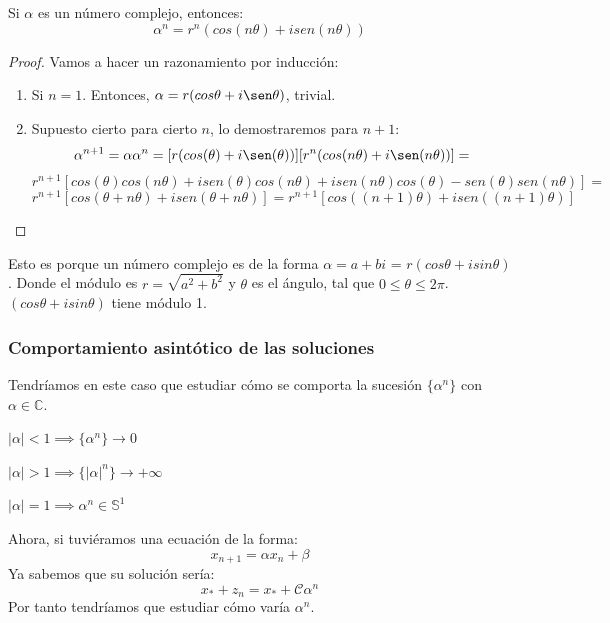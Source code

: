 \begin{nprop}
	Si $\alpha$ es un número complejo, entonces:
	\[
	\alpha^n = r^n(cos(n\theta) + i sen(n\theta))
	\]
	\begin{proof}
	Vamos a hacer un razonamiento por inducción:
	\begin{enumerate}
	\item Si $n=1$. Entonces, $\alpha = r(cos\theta +i\sen\theta)$, trivial.
	\item Supuesto cierto para cierto $n$, lo demostraremos para $n+1$:
	\[
	\alpha^{n+1} = \alpha\alpha^n =  [r(cos(\theta) +i\sen(\theta))] [r^n(cos(n\theta) +i\sen(n\theta))]=
	\]
	\[
	r^{n+1}[cos(\theta) cos(n\theta) +i sen(\theta) cos(n\theta) + isen(n\theta) cos(\theta) - sen(\theta) sen(n\theta)] = \]
	\[r^{n+1}[cos(\theta+n\theta)+isen(\theta+n\theta)] = r^{n+1}[cos((n+1)\theta)+isen((n+1)\theta)]
	\]
\end{enumerate}

\end{proof}
\end{nprop}

\begin{nota}
	Esto es porque un número complejo es de la forma $\alpha = a+bi$ = $r(cos\theta + i sin\theta)$.
	Donde el módulo es $r=\sqrt{a^2 + b^2}$ y $\theta$ es el ángulo, tal que $0 \leq \theta \leq 2\pi$.
	$(cos\theta + i sin\theta)$ tiene módulo 1.

\end{nota}

\subsubsection{Comportamiento asintótico de las soluciones}
Tendríamos en este caso que estudiar cómo se comporta la sucesión $\{\alpha^n\}$ con $\alpha \in \mathbb{C}$.
\begin{nprop}\hfill
\begin{nlist}
	\item $|\alpha|< 1 \implies \{\alpha^n\}\to 0$
	\item $|\alpha|> 1 \implies \{|\alpha|^n\}\to +\infty$
	\item $|\alpha| = 1 \implies \alpha^n \in \mathbb{S}^1$
\end{nlist}

\end{nprop}

Ahora, si tuviéramos una ecuación de la forma:
\[
x_{n+1}= \alpha x_n + \beta
\]
Ya sabemos que su solución sería:
\[
x_* +z_n = x_* + \mathcal{C}\alpha^n
\]
Por tanto tendríamos que estudiar cómo varía $\alpha^n$.


